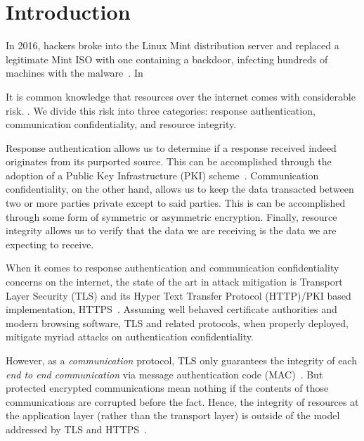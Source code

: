 \section{Introduction} \label{sec:introduction}


In 2016, hackers broke into the Linux Mint distribution server and replaced a
legitimate Mint ISO with one containing a backdoor, infecting hundreds of
machines with the malware~\cite{SCA-MINT1, SCA-MINT2}. In 

It is common knowledge that resources over the internet comes with considerable
risk. . We divide this risk into three
categories: response authentication, communication confidentiality, and resource
integrity.

Response authentication allows us to determine if a response received indeed
originates from its purported source. This can be accomplished through the
adoption of a Public Key Infrastructure (PKI) scheme~\cite{PKI}. Communication
confidentiality, on the other hand, allows us to keep the data transacted
between two or more parties private except to said parties. This is can be
accomplished through some form of symmetric or asymmetric encryption. Finally,
resource integrity allows us to verify that the data we are receiving is the
data we are expecting to receive.


When it comes to response authentication and communication confidentiality
concerns on the internet, the state of the art in attack mitigation is Transport
Layer Security (TLS) and its Hyper Text Transfer Protocol (HTTP)/PKI based
implementation, HTTPS~\cite{TLS1.2, TLS1, TLS0, HTTPS, PKI}. Assuming well
behaved certificate authorities and modern browsing software, TLS and related
protocols, when properly deployed, mitigate myriad attacks on authentication
confidentiality.

However, as a \textit{communication} protocol, TLS only guarantees the integrity
of each \textit{end to end communication} via message authentication code
(MAC)~\cite{TLS1.2}. But protected encrypted communications mean nothing if the
contents of those communications are corrupted before the fact. Hence, the
integrity of resources at the application layer (rather than the transport
layer) is outside of the model addressed by TLS and HTTPS~\cite{TLS1.2, HTTPS}.

